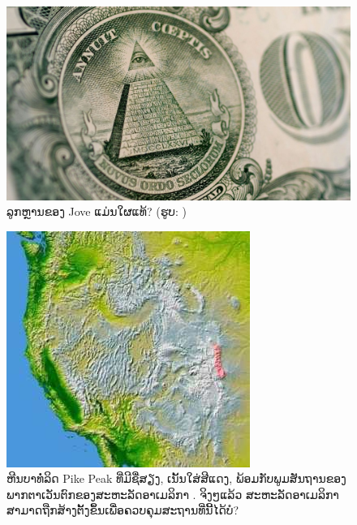 \documentclass[10pt,twocolumn,letterpaper]{article}
\begin{document}
\begin{figure}[t]
\begin{center}
   \includegraphics[width=1\linewidth]{illuminati.jpg}
\end{center}
   \caption{ລູກຫຼານຂອງ Jove ແມ່ນໃຜແທ້? (ຮູບ: \cite{35})}
\label{fig:10}
\label{fig:onecol}
\end{figure}

\begin{figure}[t]
\begin{center}
   \includegraphics[width=1\linewidth]{pike.jpg}
\end{center}
   \caption{ຫີນບາທໍ່ລິດ Pike Peak ທີ່ມີຊື່ສຽງ, ເນັ້ນໃສ່ສີແດງ, ພ້ອມກັບພູມສັນຖານຂອງພາກຕາເວັນຕົກຂອງສະຫະລັດອາເມລິກາ \cite{36}. ຈິງໆແລ້ວ ສະຫະລັດອາເມລິກາສາມາດຖືກສ້າງຕັ້ງຂຶ້ນເພື່ອຄວບຄຸມສະຖານທີ່ນີ້ໄດ້ບໍ?}
\label{fig:11}
\label{fig:onecol}
\end{figure}
\end{document}

